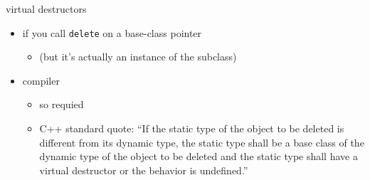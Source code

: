 \begin{frame}{virtual destructors}
    \begin{itemize}
    \item {} if you call \texttt{delete} on a base-class pointer
        \begin{itemize}
        \item (but it's actually an instance of the subclass)
        \end{itemize}
    \item compiler 
        \begin{itemize}
            \item so requied 
            \item C++ standard quote: ``If the static type of the object to be deleted is different from its
dynamic type, the static type shall be a base class of the dynamic type of the object to be deleted and the
static type shall have a virtual destructor or the behavior is undefined.''
        \end{itemize}
    \end{itemize}
\end{frame}

